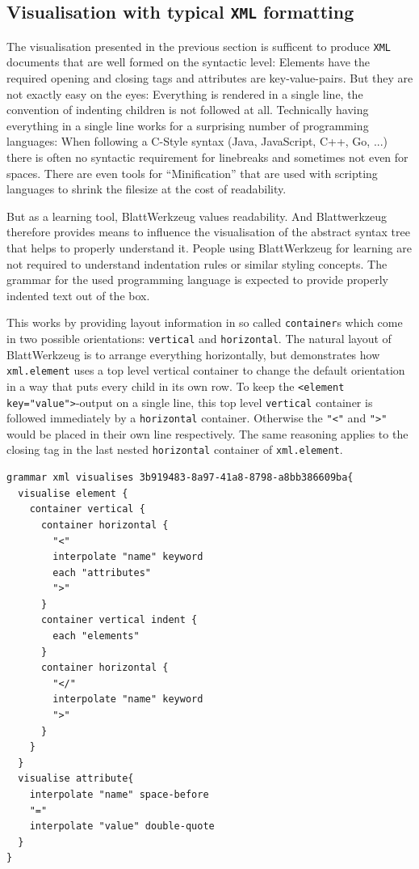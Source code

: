 \documentclass[]{report}
\begin{document}
\subsection{Visualisation with typical \texttt{XML} formatting}
\label{sec:visualisation-in-lines}

The visualisation presented in the previous section is sufficent to produce \texttt{XML} documents that are well formed on the syntactic level: Elements have the required opening and closing tags and attributes are key-value-pairs. But they are not exactly easy on the eyes: Everything is rendered in a single line, the convention of indenting children is not followed at all. Technically having everything in a single line works for a surprising number of programming languages: When following a C-Style syntax (Java, JavaScript, C++, Go, ...) there is often no syntactic requirement for linebreaks and sometimes not even for spaces. There are even tools for \enquote{Minification} that are used with scripting languages to shrink the filesize at the cost of readability.

But as a learning tool, Blatt\-Werkzeug values readability. And Blattwerkzeug therefore provides means to influence the visualisation of the abstract syntax tree that helps to properly understand it. People using Blatt\-Werkzeug for learning are not required to understand indentation rules or similar styling concepts. The grammar for the used programming language is expected to provide properly indented text out of the box.

This works by providing layout information in so called \texttt{container}s which come in two possible orientations: \texttt{vertical} and \texttt{horizontal}. The natural layout of Blatt\-Werkzeug is to arrange everything horizontally, but  demonstrates how \texttt{xml.element} uses a top level vertical container to change the default orientation in a way that puts every child in its own row. To keep the \texttt{<element key="value">}-output on a single line, this top level \texttt{vertical} container is followed immediately by a \texttt{horizontal} container. Otherwise the \texttt{"<"} and \texttt{">"} would be placed in their own line respectively. The same reasoning applies to the closing tag in the last nested \texttt{horizontal} container of \texttt{xml.element}.

\begin{listing}[H]
\begin{verbatim}
grammar xml visualises 3b919483-8a97-41a8-8798-a8bb386609ba{
  visualise element {
    container vertical {
      container horizontal {
        "<"
        interpolate "name" keyword
        each "attributes"
        ">"
      }
      container vertical indent {
        each "elements"
      }
      container horizontal {
        "</"
        interpolate "name" keyword
        ">"
      }
    }
  }
  visualise attribute{
    interpolate "name" space-before
    "="
    interpolate "value" double-quote
  }
}
\end{verbatim}
\caption{XML Visualisation: With containers for proper indentation and line breaks}
\label{lst:xml-visual}
\end{listing}
\end{document}
